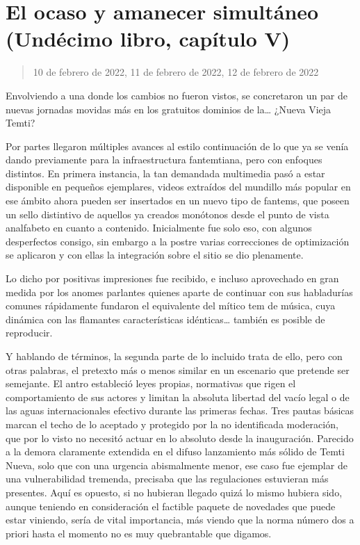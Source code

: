 \documentclass[
]{book}
\begin{document}
\hypertarget{el-ocaso-y-amanecer-simultuxe1neo-unduxe9cimo-libro-capuxedtulo-v}{%
\section{El ocaso y amanecer simultáneo (Undécimo libro, capítulo V)}\label{el-ocaso-y-amanecer-simultuxe1neo-unduxe9cimo-libro-capuxedtulo-v}}

\begin{quote}
10 de febrero de 2022, 11 de febrero de 2022, 12 de febrero de 2022
\end{quote}

Envolviendo a una donde los cambios no fueron vistos, se concretaron un par de nuevas jornadas movidas más en los gratuitos dominios de la\ldots{} ¿Nueva Vieja Temti?

Por partes llegaron múltiples avances al estilo continuación de lo que ya se venía dando previamente para la infraestructura fantemtiana, pero con enfoques distintos. En primera instancia, la tan demandada multimedia pasó a estar disponible en pequeños ejemplares, videos extraídos del mundillo más popular en ese ámbito ahora pueden ser insertados en un nuevo tipo de fantems, que poseen un sello distintivo de aquellos ya creados monótonos desde el punto de vista analfabeto en cuanto a contenido. Inicialmente fue solo eso, con algunos desperfectos consigo, sin embargo a la postre varias correcciones de optimización se aplicaron y con ellas la integración sobre el sitio se dio plenamente.

Lo dicho por positivas impresiones fue recibido, e incluso aprovechado en gran medida por los anomes parlantes quienes aparte de continuar con sus habladurías comunes rápidamente fundaron el equivalente del mítico tem de música, cuya dinámica con las flamantes características idénticas\ldots{} también es posible de reproducir.

Y hablando de términos, la segunda parte de lo incluido trata de ello, pero con otras palabras, el pretexto más o menos similar en un escenario que pretende ser semejante. El antro estableció leyes propias, normativas que rigen el comportamiento de sus actores y limitan la absoluta libertad del vacío legal o de las aguas internacionales efectivo durante las primeras fechas. Tres pautas básicas marcan el techo de lo aceptado y protegido por la no identificada moderación, que por lo visto no necesitó actuar en lo absoluto desde la inauguración. Parecido a la demora claramente extendida en el difuso lanzamiento más sólido de Temti Nueva, solo que con una urgencia abismalmente menor, ese caso fue ejemplar de una vulnerabilidad tremenda, precisaba que las regulaciones estuvieran más presentes. Aquí es opuesto, si no hubieran llegado quizá lo mismo hubiera sido, aunque teniendo en consideración el factible paquete de novedades que puede estar viniendo, sería de vital importancia, más viendo que la norma número dos a priori hasta el momento no es muy quebrantable que digamos.
\end{document}
